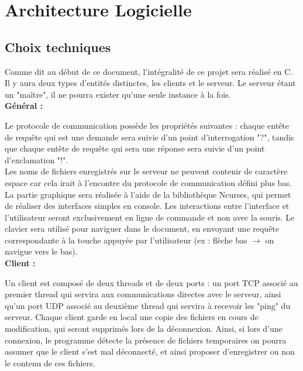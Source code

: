 \documentclass[12pt]{article}
\begin{document}
\section{Architecture Logicielle}
\subsection{Choix techniques}
Comme dit au début de ce document, l'intégralité de ce projet sera réalisé en C. Il y aura deux types d'entités distinctes, les clients et le serveur. Le serveur étant un "maître", il ne pourra exister qu'une seule instance à la fois.\\

\textbf{Général :}

Le protocole de communication possède les propriétés suivantes : chaque entête de requête qui est une demande sera suivie d'un point d'interrogation "?", tandis que chaque entête de requête qui sera une réponse sera suivie d'un point d'exclamation "!".\\

Les noms de fichiers enregistrés sur le serveur ne peuvent contenir de caractère espace car cela irait à l'encontre du protocole de communication défini plus bas.\\

La partie graphique sera réalisée à l'aide de la bibliothèque Ncurses, qui permet de réaliser des interfaces simples en console. Les interactions entre l'interface et l'utilisateur seront exclusivement en ligne de commande et non avec la souris. Le clavier sera utilisé pour naviguer dans le document, en envoyant une requête correspondante à la touche appuyée par l'utilisateur (ex : flèche bas $\rightarrow$ on navigue vers le bas).\\

\textbf{Client :}

Un client est composé de deux threads et de deux ports : un port TCP associé au premier thread qui servira aux communications directes avec le serveur, ainsi qu'un port UDP associé au deuxième thread qui servira à recevoir les "ping" du serveur. Chaque client garde en local une copie des fichiers en cours de modification, qui seront supprimés lors de la déconnexion. Ainsi, si lors d'une connexion, le programme détecte la présence de fichiers temporaires on pourra assumer que le client s'est mal déconnecté, et ainsi proposer d'enregistrer ou non le contenu de ces fichiers.\\
\end{document}
